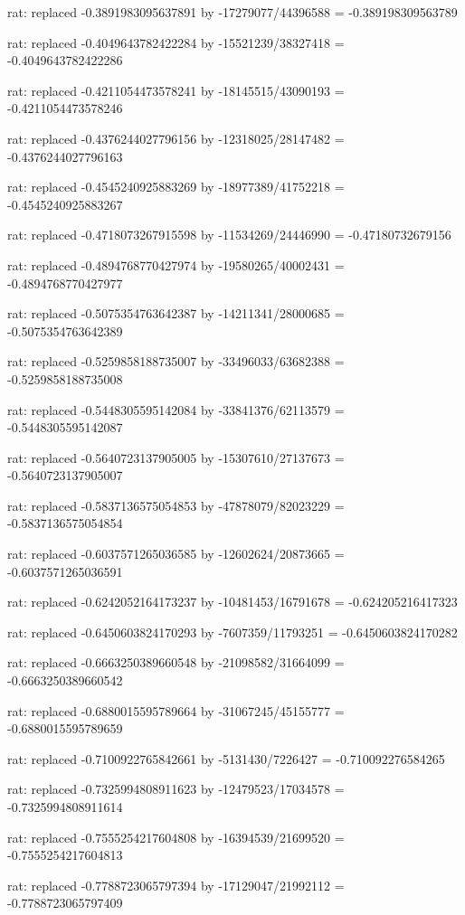 \documentclass[a4paper,10pt]{article}
\begin{document}
\begin{eulernotebook}
\begin{eulercomment}
\begin{eulercomment}
\begin{eulercomment}
\begin{eulercomment}
\begin{eulercomment}
\begin{eulercomment}
\begin{eulercomment}
\begin{eulercomment}
\begin{eulercomment}
\begin{eulercomment}
\begin{eulercomment}
\begin{eulercomment}
\begin{eulercomment}
\begin{eulercomment}
\begin{eulercomment}
\begin{eulercomment}
\begin{euleroutput}
  rat: replaced -0.3891983095637891 by -17279077/44396588 = -0.389198309563789
  
  rat: replaced -0.4049643782422284 by -15521239/38327418 = -0.4049643782422286
  
  rat: replaced -0.4211054473578241 by -18145515/43090193 = -0.4211054473578246
  
  rat: replaced -0.4376244027796156 by -12318025/28147482 = -0.4376244027796163
  
  rat: replaced -0.4545240925883269 by -18977389/41752218 = -0.4545240925883267
  
  rat: replaced -0.4718073267915598 by -11534269/24446990 = -0.47180732679156
  
  rat: replaced -0.4894768770427974 by -19580265/40002431 = -0.4894768770427977
  
  rat: replaced -0.5075354763642387 by -14211341/28000685 = -0.5075354763642389
  
  rat: replaced -0.5259858188735007 by -33496033/63682388 = -0.5259858188735008
  
  rat: replaced -0.5448305595142084 by -33841376/62113579 = -0.5448305595142087
  
  rat: replaced -0.5640723137905005 by -15307610/27137673 = -0.5640723137905007
  
  rat: replaced -0.5837136575054853 by -47878079/82023229 = -0.5837136575054854
  
  rat: replaced -0.6037571265036585 by -12602624/20873665 = -0.6037571265036591
  
  rat: replaced -0.6242052164173237 by -10481453/16791678 = -0.624205216417323
  
  rat: replaced -0.6450603824170293 by -7607359/11793251 = -0.6450603824170282
  
  rat: replaced -0.6663250389660548 by -21098582/31664099 = -0.6663250389660542
  
  rat: replaced -0.6880015595789664 by -31067245/45155777 = -0.6880015595789659
  
  rat: replaced -0.7100922765842661 by -5131430/7226427 = -0.710092276584265
  
  rat: replaced -0.7325994808911623 by -12479523/17034578 = -0.7325994808911614
  
  rat: replaced -0.7555254217604808 by -16394539/21699520 = -0.7555254217604813
  
  rat: replaced -0.7788723065797394 by -17129047/21992112 = -0.7788723065797409
  

\end{euleroutput}
\end{eulercomment}
\end{eulercomment}
\end{eulercomment}
\end{eulercomment}
\end{eulercomment}
\end{eulercomment}
\end{eulercomment}
\end{eulercomment}
\end{eulercomment}
\end{eulercomment}
\end{eulercomment}
\end{eulercomment}
\end{eulercomment}
\end{eulercomment}
\end{eulercomment}
\end{eulercomment}
\end{eulernotebook}
\end{document}
